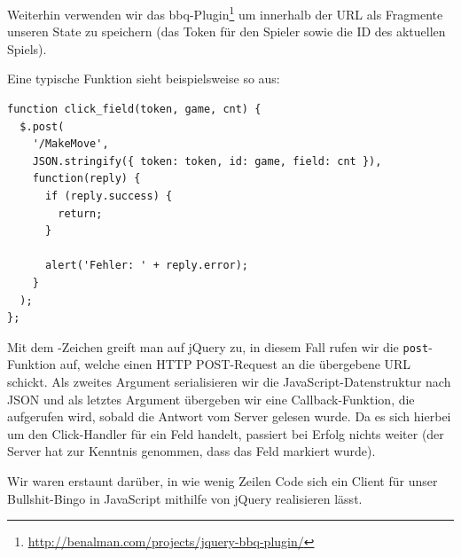 \documentclass[12pt, a4paper]{scrartcl}
\begin{document}
Weiterhin verwenden wir das
bbq-Plugin\footnote{\url{http://benalman.com/projects/jquery-bbq-plugin/}} um
innerhalb der URL als Fragmente unseren State zu speichern (das Token für den
Spieler sowie die ID des aktuellen Spiels).
\np

Eine typische Funktion sieht beispielsweise so aus:
\begin{lstlisting}
function click_field(token, game, cnt) {
  $.post(
    '/MakeMove',
    JSON.stringify({ token: token, id: game, field: cnt }),
    function(reply) {
      if (reply.success) {
        return;
      }

      alert('Fehler: ' + reply.error);
    }
  );
};
\end{lstlisting}

Mit dem \textdollar{}-Zeichen greift man auf jQuery zu, in diesem Fall rufen
wir die \texttt{post}-Funktion auf, welche einen HTTP POST-Request an die
übergebene URL schickt. Als zweites Argument serialisieren wir die
JavaScript-Datenstruktur nach JSON und als letztes Argument übergeben wir eine
Callback-Funktion, die aufgerufen wird, sobald die Antwort vom Server gelesen
wurde. Da es sich hierbei um den Click-Handler für ein Feld handelt, passiert
bei Erfolg nichts weiter (der Server hat zur Kenntnis genommen, dass das Feld
markiert wurde).
\np

Wir waren erstaunt darüber, in wie wenig Zeilen Code sich ein Client für unser
Bullshit-Bingo in JavaScript mithilfe von jQuery realisieren lässt.
\end{document}

